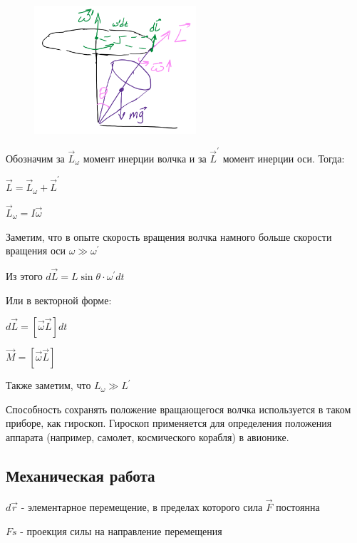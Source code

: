 \documentclass[12pt]{article}
\begin{document}
    \begin{minipage}{\textwidth}
        \begin{figure}
            \includegraphics[width=6cm]{physics1/images/physics1_2024_10_14_2}
        \end{figure}
        
        Обозначим за $\vec{L}_\omega$ момент инерции 
        волчка и за $\vec{L}^\prime$ момент инерции оси. Тогда:
        
        $\vec{L} = \vec{L}_\omega + \vec{L}^\prime$

        $\vec{L}_\omega = I \vec{\omega}$

        Заметим, что в опыте скорость вращения волчка намного больше скорости вращения оси $\omega \gg \omega^\prime$

        Из этого $d\vec{L} = L \sin\theta \cdot \omega^\prime dt$

    \end{minipage}
    
    \smallvspace

    Или в векторной форме:

    $d\vec{L} = [\vec{\omega}\vec{L}]dt$

    $\vec{M} = [\vec{\omega}\vec{L}]$

    Также заметим, что $L_\omega \gg L^\prime$

    Способность сохранять положение вращающегося волчка используется в таком приборе, как гироскоп. 
    Гироскоп применяется для определения положения аппарата (например, самолет, космического корабля) в авионике.



    \subsection{Механическая работа}

    $d\vec{r}$ - элементарное перемещение, в пределах которого сила $\vec{F}$ постоянна

    $Fs$ - проекция силы на направление перемещения
\end{document}
